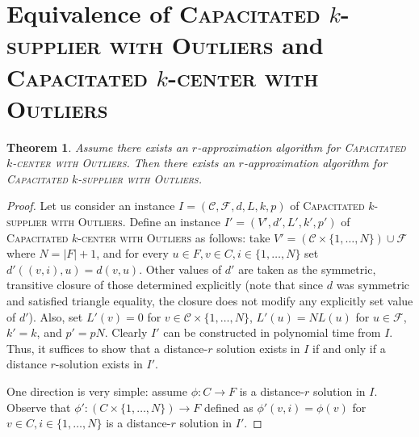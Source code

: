 \documentclass{article}
\newcommand{\F}{\mathcal{F}}
\newcommand{\C}{\mathcal{C}}
\theoremstyle{plain}
\newtheorem{theorem}{Theorem}
\theoremstyle{definition}
\begin{document}
\section{Equivalence of \textsc{Capacitated} $k$-\textsc{supplier with Outliers} and \textsc{Capacitated} $k$-\textsc{center with Outliers}}\label{app:equivalence}

\begin{theorem}
Assume there exists an $r$-approximation algorithm for \textsc{Capacitated} $k$-\textsc{center with Outliers}.
Then there exists an $r$-approximation algorithm for \textsc{Capacitated} $k$-\textsc{supplier with Outliers}.
\end{theorem}
\begin{proof}
Let us consider an instance $I=(\C,\F,d,L, k,p)$ of \textsc{Capacitated} $k$-\textsc{supplier with Outliers}.
Define an instance $I'=(V',d',L', k',p')$ of \textsc{Capacitated} $k$-\textsc{center with Outliers} as
follows: take $V' = (\C\times\{1,\ldots,N\})\cup \F$ where $N=|F|+1$, and
for every $u\in F, v\in C, i\in\{1,\ldots,N\}$ set $d'((v,i),u)=d(v,u)$. Other values of $d'$ 
are taken as the symmetric, transitive closure of those determined explicitly (note that since $d$ was symmetric and satisfied triangle equality,
the closure does not modify any explicitly set value of $d'$).
Also, set $L'(v) = 0$ for $v\in \C\times\{1,\ldots,N\}$, $L'(u)=NL(u)$ for $u\in \F$, $k' = k$, and $p' = pN$.
Clearly $I'$ can be constructed in polynomial time from $I$.
Thus, it suffices to show that a distance-$r$ solution exists in $I$ if
and only if a distance $r$-solution exists in $I'$.

One direction is very simple: assume $\phi:C\to F$ is a distance-$r$ solution in $I$.
Observe that $\phi':(C\times \{1,\ldots,N\})\to F$ defined as $\phi'(v,i)=\phi(v)$
for $v\in C, i\in\{1,\ldots,N\}$ is a distance-$r$ solution in $I'$.


\end{proof}
\end{document}
